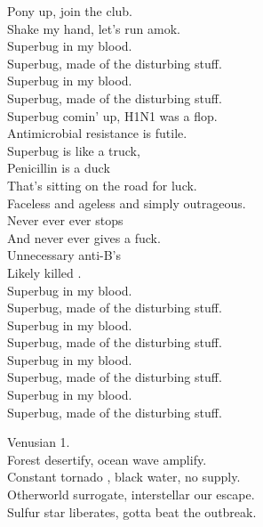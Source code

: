 Pony up, join the club. \\
Shake my hand, let's run amok. \\

Superbug in my blood. \\
Superbug, made of the disturbing stuff. \\
Superbug in my blood. \\
Superbug, made of the disturbing stuff. \\

Superbug comin' up, H1N1 was a flop. \\
Antimicrobial resistance is futile. \\
Superbug is like a truck, \\
Penicillin is a duck \\
That's sitting on the road for luck. \\

Faceless and ageless and simply outrageous. \\
Never ever ever stops \\
And never ever gives a fuck. \\

Unnecessary anti-B's \\
Likely killed . \\

Superbug in my blood. \\
Superbug, made of the disturbing stuff. \\
Superbug in my blood. \\
Superbug, made of the disturbing stuff. \\

Superbug in my blood. \\
Superbug, made of the disturbing stuff. \\
Superbug in my blood. \\
Superbug, made of the disturbing stuff. \\





Venusian 1. \\

Forest desertify, ocean wave amplify. \\
Constant tornado , black water, no supply. \\
Otherworld surrogate, interstellar our escape. \\
Sulfur star liberates, gotta beat the outbreak. \\

